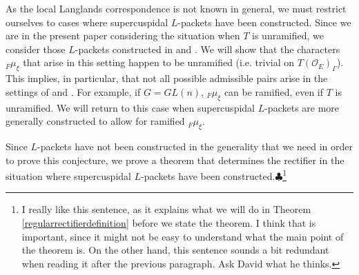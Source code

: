 \documentclass[11pt]{amsart}
\theoremstyle{plain}
\newcommand{\MAxxx}[1]{$\clubsuit$\footnote{#1}}
\theoremstyle{definition}
\begin{document}
As the local Langlands correspondence is not known in general, we must restrict
ourselves to cases where supercuspidal $L$-packets have been constructed.
Since we are in the present paper considering the situation when $T$ is unramified,
we consider those $L$-packets constructed in \cite{debackerreeder} and \cite{reeder}.
We will show that the characters ${}_F \mu_{\xi}$ that arise in this setting
happen to be unramified (i.e. trivial on $T(\mathcal{O}_E)_{\Gamma}$).  This implies,
in particular, that not all possible admissible pairs arise in the settings
of \cite{debackerreeder} and \cite{reeder}.  
For example, if $G = GL(n)$, ${}_F \mu_{\xi}$ can be ramified,
even if $T$ is unramified.  We will return to this case when supercuspidal $L$-packets
are more generally constructed to allow for ramified ${}_F \mu_{\xi}$.

Since $L$-packets have not been constructed in the generality that
we need in order to prove this conjecture, we prove a theorem that determines
the rectifier in the situation where supercuspidal $L$-packets have been 
constructed.\MAxxx{I really like this sentence, as it explains what we will do
in Theorem \ref{regularrectifierdefinition} before we state the theorem. I think
that is important, since it might not be easy to understand what the main
point of the theorem is.  On the other hand, this sentence sounds a bit
redundant when reading it after the previous paragraph.  Ask David what
he thinks.}
\end{document}
